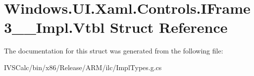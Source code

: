 \hypertarget{struct_windows_1_1_u_i_1_1_xaml_1_1_controls_1_1_i_frame3_____impl_1_1_vtbl}{}\section{Windows.\+U\+I.\+Xaml.\+Controls.\+I\+Frame3\+\_\+\+\_\+\+Impl.\+Vtbl Struct Reference}
\label{struct_windows_1_1_u_i_1_1_xaml_1_1_controls_1_1_i_frame3_____impl_1_1_vtbl}


The documentation for this struct was generated from the following file\+:\begin{DoxyCompactItemize}
\item 
I\+V\+S\+Calc/bin/x86/\+Release/\+A\+R\+M/ilc/Impl\+Types.\+g.\+cs\end{DoxyCompactItemize}
